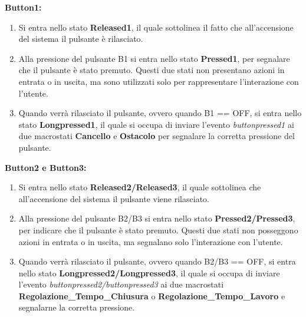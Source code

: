             \noindent \textbf{Button1:}
            \begin{enumerate}
                \item Si entra nello stato \textbf{Released1}, il quale sottolinea il fatto che all'accensione del sistema il pulsante è rilasciato.
                
                \item Alla pressione del pulsante B1 si entra nello stato \textbf{Pressed1}, per segnalare che il pulsante è stato premuto. Questi due stati non presentano azioni in entrata o in uscita, ma sono utilizzati solo per rappresentare l'interazione con l'utente.
                
                \item Quando verrà rilasciato il pulsante, ovvero quando B1 == OFF, si entra nello stato \textbf{Longpressed1}, il quale si occupa di inviare l'evento \textit{buttonpressed1} ai due macrostati \textbf{Cancello} e \textbf{Ostacolo} per segnalare la corretta pressione del pulsante. 
            \end{enumerate}

            \noindent \textbf{Button2 e Button3:}

            \begin{enumerate}
                \item Si entra nello stato \textbf{Released2/Released3}, il quale sottolinea che all'accensione del sistema il pulsante viene rilasciato.
                
                \item Alla pressione del pulsante B2/B3 si entra nello stato \textbf{Pressed2/Pressed3}, per indicare che il pulsante è stato premuto. Questi due stati non posseggono azioni in entrata o in uscita, ma segnalano solo l'interazione con l'utente.
                
                \item Quando verrà rilasciato il pulsante, ovvero quando B2/B3 == OFF, si entra nello stato \textbf{Longpressed2/Longpressed3}, il quale si occupa di inviare l'evento \textit{buttonpressed2/buttonpressed3} ai due macrostati \textbf{Regolazione\_Tempo\_Chiusura} o \textbf{Regolazione\_Tempo\_Lavoro} e segnalarne la corretta pressione. 
            \end{enumerate}

            

